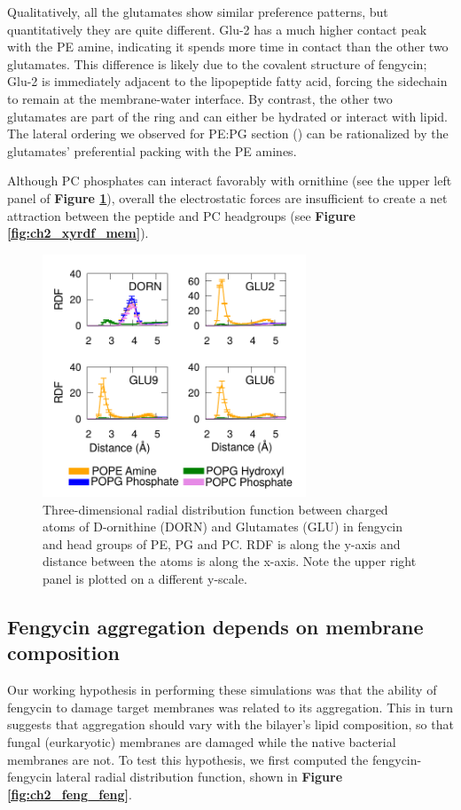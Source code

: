 Qualitatively, all the glutamates show similar preference patterns, but
quantitatively they are quite different. Glu-2 has a much higher contact peak with the PE amine,
indicating it spends more time in contact
than the other two glutamates. This difference is likely
due to the covalent structure of fengycin; Glu-2 is immediately adjacent
to the lipopeptide fatty acid, forcing the sidechain to remain at the
membrane-water interface.  By contrast, the other two glutamates are
part of the ring and can either be hydrated or interact with
lipid. The lateral ordering we observed for PE:PG section (\textbf{}) can be rationalized by the glutamates'
preferential packing with the PE amines.

Although PC phosphates can interact favorably with ornithine (see the upper
left panel of \textbf{Figure \ref{fig:ch2_atomic_rdf}}), overall  the electrostatic forces
are insufficient to create a net attraction between the peptide and PC
headgroups (see \textbf{Figure \ref{fig:ch2_xyrdf_mem}}).

\begin{figure}
\centering
\includegraphics[width=0.7\textwidth]{chapter2_figs/atomic_rdf.pdf}
\caption{\label{fig:ch2_atomic_rdf} Three-dimensional radial distribution function between
charged atoms of D-ornithine (DORN) and Glutamates (GLU) in fengycin and head groups of
PE, PG and PC. RDF is along the y-axis and distance between the atoms is along the x-axis.
Note the upper right panel is plotted on a different y-scale.}
\end{figure}
\newpage

\subsection{Fengycin aggregation depends on membrane composition}
\label{subsec:fengxyrdf}
Our working hypothesis in performing these simulations was that the ability of
fengycin to damage target membranes was related to its aggregation.\cite{HornGrossfield2013}
 This in turn suggests that aggregation should vary with the bilayer's
lipid composition, so that fungal (eurkaryotic) membranes are damaged while the
native bacterial membranes are not.  To test this hypothesis, we first computed
the fengycin-fengycin lateral radial distribution function, shown in \textbf{Figure \ref{fig:ch2_feng_feng}}.

